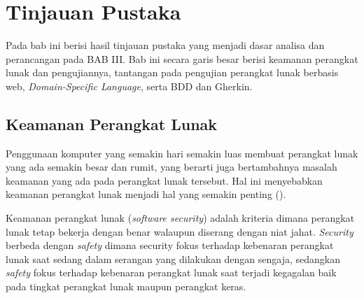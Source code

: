 \chapter{Tinjauan Pustaka}

Pada bab ini berisi hasil tinjauan pustaka yang menjadi dasar analisa dan perancangan pada BAB III.
Bab ini secara garis besar berisi keamanan perangkat lunak dan pengujiannya,
tantangan pada pengujian perangkat lunak berbasis web, \emph{Domain-Specific Language}, serta BDD dan Gherkin.



\section{Keamanan Perangkat Lunak}

Penggunaan komputer yang semakin hari semakin luas membuat perangkat lunak yang ada semakin besar dan rumit,
yang berarti juga bertambahnya masalah keamanan yang ada pada perangkat lunak tersebut.
Hal ini menyebabkan keamanan perangkat lunak menjadi hal yang semakin penting (\cite{grawsec}).

Keamanan perangkat lunak (\emph{software security}) adalah kriteria dimana perangkat lunak tetap bekerja
dengan benar walaupun diserang dengan niat jahat.
\emph{Security} berbeda dengan \emph{safety}
dimana security fokus terhadap kebenaran
perangkat lunak saat sedang dalam serangan yang dilakukan dengan sengaja, sedangkan \emph{safety} fokus terhadap
kebenaran perangkat lunak saat terjadi kegagalan baik pada tingkat perangkat lunak maupun perangkat keras.

